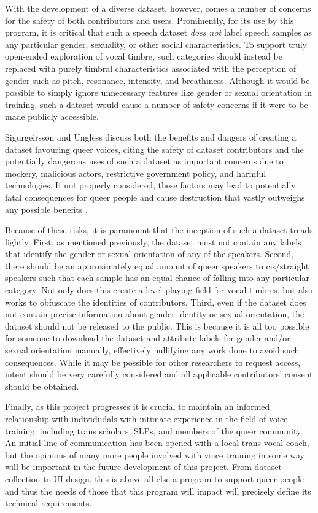 \documentclass{article}
\begin{document}
With the development of a diverse dataset, however, comes a number of concerns for the safety of both contributors and users. Prominently, for its use by this program, it is critical that such a speech dataset \textit{does not} label speech samples as any particular gender, sexuality, or other social characteristics. To support truly open-ended exploration of vocal timbre, such categories should instead be replaced with purely timbral characteristics associated with the perception of gender such as pitch, resonance, intensity, and breathiness. Although it would be possible to simply ignore unnecessary features like gender or sexual orientation in training, such a dataset would cause a number of safety concerns if it were to be made publicly accessible.

Sigurgeirsson and Ungless \cite{sigurgeirsson2024} discuss both the benefits and dangers of creating a dataset favouring queer voices, citing the safety of dataset contributors and the potentially dangerous uses of such a dataset as important concerns due to mockery, malicious actors, restrictive government policy, and harmful technologies. If not properly considered, these factors may lead to potentially fatal consequences for queer people and cause destruction that vastly outweighs any possible benefits \cite{tvt2012}.

Because of these risks, it is paramount that the inception of such a dataset treads lightly. First, as mentioned previously, the dataset must not contain any labels that identify the gender or sexual orientation of any of the speakers. Second, there should be an approximately equal amount of queer speakers to cis/straight speakers such that each sample has an equal chance of falling into any particular category. Not only does this create a level playing field for vocal timbres, but also works to obfuscate the identities of contributors. Third, even if the dataset does not contain precise information about gender identity or sexual orientation, the dataset should not be released to the public. This is because it is all too possible for someone to download the dataset and attribute labels for gender and/or sexual orientation manually, effectively nullifying any work done to avoid such consequences. While it may be possible for other researchers to request access, intent should be very carefully considered and all applicable contributors' consent should be obtained.

Finally, as this project progresses it is crucial to maintain an informed relationship with individudals with intimate experience in the field of voice training, including trans scholars, SLPs, and members of the queer community. An initial line of communication has been opened with a local trans vocal coach, but the opinions of many more people involved with voice training in some way will be important in the future development of this project. From dataset collection to UI design, this is above all else a program to support queer people and thus the needs of those that this program will impact will precisely define its technical requirements.
\end{document}
